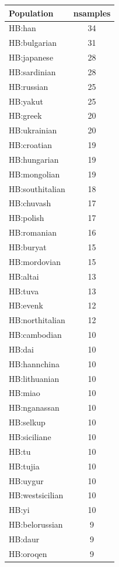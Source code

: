 \begin{table}
\small
\begin{tabular}{l|c}
\hline
Population & nsamples\\
\hline
HB:han & 34\\
\hline
HB:bulgarian & 31\\
\hline
HB:japanese & 28\\
\hline
HB:sardinian & 28\\
\hline
HB:russian & 25\\
\hline
HB:yakut & 25\\
\hline
HB:greek & 20\\
\hline
HB:ukrainian & 20\\
\hline
HB:croatian & 19\\
\hline
HB:hungarian & 19\\
\hline
HB:mongolian & 19\\
\hline
HB:southitalian & 18\\
\hline
HB:chuvash & 17\\
\hline
HB:polish & 17\\
\hline
HB:romanian & 16\\
\hline
HB:buryat & 15\\
\hline
HB:mordovian & 15\\
\hline
HB:altai & 13\\
\hline
HB:tuva & 13\\
\hline
HB:evenk & 12\\
\hline
HB:northitalian & 12\\
\hline
HB:cambodian & 10\\
\hline
HB:dai & 10\\
\hline
HB:hannchina & 10\\
\hline
HB:lithuanian & 10\\
\hline
HB:miao & 10\\
\hline
HB:nganassan & 10\\
\hline
HB:selkup & 10\\
\hline
HB:siciliane & 10\\
\hline
HB:tu & 10\\
\hline
HB:tujia & 10\\
\hline
HB:uygur & 10\\
\hline
HB:westsicilian & 10\\
\hline
HB:yi & 10\\
\hline
HB:belorussian & 9\\
\hline
HB:daur & 9\\
\hline
HB:oroqen & 9\\
\hline

\end{tabular}
\end{table}
